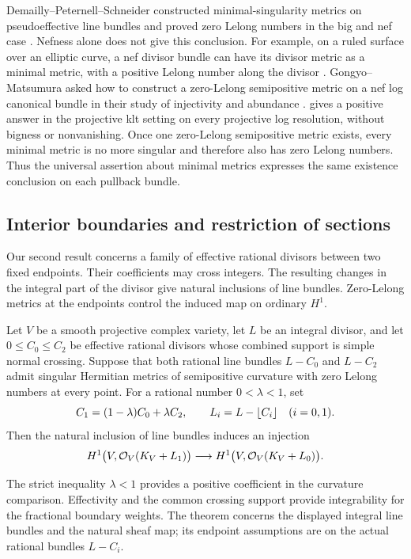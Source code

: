Demailly--Peternell--Schneider constructed minimal-singularity metrics
on pseudoeffective line bundles and proved zero Lelong numbers in the
big and nef case \cite[Theorem~1.5 and Proposition~1.7]{DPS2001}.
Nefness alone does not give this conclusion. For example, on a ruled
surface over an elliptic curve, a nef divisor bundle can have its
divisor metric as a minimal metric, with a positive Lelong number
along the divisor \cite[Corollary~1.2 and Example~3.5]{Koike2015}.
Gongyo--Matsumura asked how to construct a zero-Lelong semipositive
metric on a nef log canonical bundle in their study of injectivity and abundance
\cite[Question~5.6]{GongyoMatsumura2017}.
 gives a positive answer in the projective klt
setting on every projective log resolution, without bigness or
nonvanishing. Once one zero-Lelong semipositive metric exists, every
minimal metric is no more singular and therefore also has zero Lelong
numbers. Thus the universal assertion about minimal metrics expresses
the same existence conclusion on each pullback bundle.

\subsection{Interior boundaries and restriction of sections}

Our second result concerns a family of effective rational divisors
between two fixed endpoints. Their coefficients may cross integers.
The resulting changes in the integral part of the divisor give natural
inclusions of line bundles. Zero-Lelong metrics at the endpoints
control the induced map on ordinary $H^1$.

\begin{theorem}\label{thm:interior-injectivity}
Let $V$ be a smooth projective complex variety, let $L$ be an integral
divisor, and let $0\le C_0\le C_2$ be effective rational divisors whose
combined support is simple normal crossing.  Suppose that both
rational line bundles $L-C_0$ and $L-C_2$ admit singular Hermitian
metrics of semipositive curvature with zero Lelong numbers at every
point.  For a rational number $0<\lambda<1$, set
\[
 C_1=(1-\lambda)C_0+\lambda C_2,\qquad
 L_i=L-\lfloor C_i\rfloor\quad(i=0,1).
\]
Then the natural inclusion of line bundles induces an injection
\[
 H^1\bigl(V,\mathcal O_V(K_V+L_1)\bigr)
 \longrightarrow H^1\bigl(V,\mathcal O_V(K_V+L_0)\bigr).
\]
\end{theorem}

The strict inequality $\lambda<1$ provides a positive coefficient in
the curvature comparison. Effectivity and the common crossing support
provide integrability for the fractional boundary weights. The theorem
concerns the displayed integral line bundles and the natural sheaf map;
its endpoint assumptions are on the actual rational bundles $L-C_i$.

